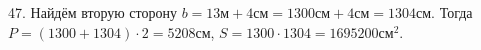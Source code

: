 47. Найдём вторую сторону $b=13\text{м}+4\text{см}=1300\text{см}+4\text{см}=1304\text{см}.$ Тогда $P=(1300+1304)\cdot2=5208$см, $S=1300\cdot1304=1695200\text{см}^2.$\\
